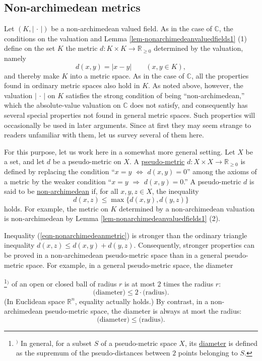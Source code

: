 \documentclass[a4paper,12pt, dvipdfmx]{jsbook}
\def\R{\mathbb{R}}
\def\C{\mathbb{C}}
\newcommand{\abs}[1]{\lvert#1\rvert}
\theoremstyle{plain}
\theoremstyle{definition}
\newcounter{chushaku}
\def\chu#1{\addtocounter{chushaku}{1}\footnote[\value{chushaku}]{${}^)$ #1}${}^)$}
\begin{document}
\subsection{Non-archimedean metrics}\label{sub-nonarchimedeanmetric}
Let $(K,\abs{\,\cdot\,})$ be a non-archimedean valued field. As in the case of $\C$, the conditions on the valuation and Lemma \ref{lem-nonarchimedeanvaluedfields1} (1) define on the set $K$ the metric $d\colon K\times K\rightarrow\R_{\geq 0}$ determined by the valuation, namely
$$
d(x,y)=\abs{x-y}\qquad(x,y\in K),
$$
and thereby make $K$ into a metric space.
As in the case of $\C$, all the properties found in ordinary metric spaces also hold in $K$. As noted above, however, the valuation $\abs{\,\cdot\,}$ on $K$ satisfies the strong condition of being ``non-archimedean,'' which the absolute-value valuation on $\C$ does not satisfy, and consequently has several special properties not found in general metric spaces.
Such properties will occasionally be used in later arguments. Since at first they may seem strange to readers unfamiliar with them, let us survey several of them here.

For this purpose, let us work here in a somewhat more general setting.
Let $X$ be a set, and let $d$ be a pseudo-metric on $X$.
A \underline{pseudo-metric} $d\colon X\times X\rightarrow\R_{\geq 0}$ is defined by replacing the condition ``$x=y$ $\Leftrightarrow$ $d(x,y)=0$'' among the axioms of a metric by the weaker condition ``$x=y$ $\Rightarrow$ $d(x,y)=0$.''
A pseudo-metric $d$ is said to be \underline{non-archimedean} if, for all $x,y,z\in X$, the inequality
\begin{equation}\label{eqn-nonarchimedeanmetric}
d(x,z)\leq\max\{d(x,y),d(y,z)\}
\end{equation}
holds.
For example, the metric on $K$ determined by a non-archimedean valuation is non-archimedean by Lemma \ref{lem-nonarchimedeanvaluedfields1} (2).

Inequality (\ref{eqn-nonarchimedeanmetric}) is stronger than the ordinary triangle inequality $d(x,z)\leq d(x,y)+d(y,z)$.
Consequently, stronger properties can be proved in a non-archimedean pseudo-metric space than in a general pseudo-metric space.
For example, in a general pseudo-metric space, the diameter\chu{In general, for a subset $S$ of a pseudo-metric space $X$, its \underline{diameter} is defined as the supremum of the pseudo-distances between $2$ points belonging to $S$.} of an open or closed ball of radius $r$ is at most $2$ times the radius $r$:
$$
\textrm{(diameter)}\leq 2\cdot\textrm{(radius)}.
$$
(In Euclidean space $\R^n$, equality actually holds.)
By contrast, in a non-archimedean pseudo-metric space, the diameter is always at most the radius:
$$
\textrm{(diameter)}\leq\textrm{(radius)}.
$$
\end{document}
